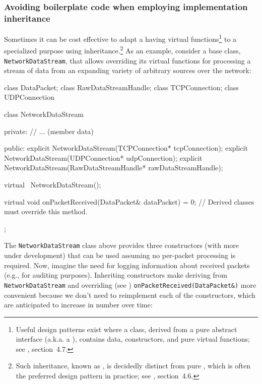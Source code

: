 \subsubsection[Avoiding boilerplate code when employing implementation inheritance]{Avoiding boilerplate code when employing implementation inheritance}\label{avoiding-boilerplate-code-when-employing-implementation-inheritance}

Sometimes it can be cost effective to adapt a 
having virtual functions{\cprotect\footnote{Useful design patterns
exist where a  class, derived from a
pure abstract interface (a.k.a. a ), contains data,
constructors, and pure virtual functions; see
  \cite{lakos2a}, section~4.7.}} to a specialized purpose
using inheritance.{\cprotect\footnote{Such inheritance, known as
, is decidedly distinct from pure
, which is often the preferred design
  pattern in practice; see \cite{lakos2b}, section~4.6.}}
As an example, consider a base class,
\lstinline!NetworkDataStream!, that allows overriding its virtual functions
for processing a stream of data from an expanding variety of arbitrary
sources over the network:

\begin{emcppshiddenlisting}
class DataPacket;                                                               
class RawDataStreamHandle;                                                      
class TCPConnection;                                                            
class UDPConnection
\end{emcppshiddenlisting}
\begin{emcppslisting}[language=C++]
class NetworkDataStream
{
private:
    // ...                   (member data)

public:
    explicit NetworkDataStream(TCPConnection* tcpConnection);
    explicit NetworkDataStream(UDPConnection* udpConnection);
    explicit NetworkDataStream(RawDataStreamHandle* rawDataStreamHandle);

    virtual ~NetworkDataStream();

    virtual void onPacketReceived(DataPacket& dataPacket) = 0;
        // Derived classes must override this method.
};        
\end{emcppslisting}
    
\noindent The \lstinline!NetworkDataStream! class above provides three constructors (with more
under development) that can be used assuming no per-packet processing is
required. Now, imagine the need for logging information about received
packets (e.g., for auditing purposes). Inheriting constructors make
deriving from \lstinline!NetworkDataStream! and overriding (see ) 
\lstinline!onPacketReceived(DataPacket&)! more convenient because we don't need to reimplement each of the constructors, which are
anticipated to increase in number over time:

